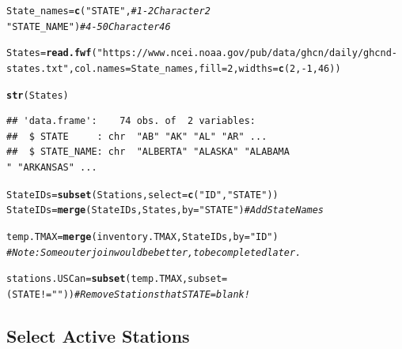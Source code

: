 \documentclass{article}\usepackage[]{graphicx}\usepackage[]{xcolor}
\makeatletter
\newcommand{\hlnum}[1]{\textcolor[rgb]{0.686,0.059,0.569}{#1}}%
\newcommand{\hlstr}[1]{\textcolor[rgb]{0.192,0.494,0.8}{#1}}%
\newcommand{\hlcom}[1]{\textcolor[rgb]{0.678,0.584,0.686}{\textit{#1}}}%
\newcommand{\hlopt}[1]{\textcolor[rgb]{0,0,0}{#1}}%
\newcommand{\hlstd}[1]{\textcolor[rgb]{0.345,0.345,0.345}{#1}}%
\newcommand{\hlkwb}[1]{\textcolor[rgb]{0.69,0.353,0.396}{#1}}%
\newcommand{\hlkwc}[1]{\textcolor[rgb]{0.333,0.667,0.333}{#1}}%
\newcommand{\hlkwd}[1]{\textcolor[rgb]{0.737,0.353,0.396}{\textbf{#1}}}%
\newenvironment{kframe}{%
 \def\at@end@of@kframe{}%
 \ifinner\ifhmode%
  \def\at@end@of@kframe{\end{minipage}}%
  \begin{minipage}{\columnwidth}%
 \fi\fi%
 \def\FrameCommand##1{\hskip\@totalleftmargin \hskip-\fboxsep
 \colorbox{shadecolor}{##1}\hskip-\fboxsep
     \hskip-\linewidth \hskip-\@totalleftmargin \hskip\columnwidth}%
 \MakeFramed {\advance\hsize-\width
   \@totalleftmargin\z@ \linewidth\hsize
   \@setminipage}}%
 {\par\unskip\endMakeFramed%
 \at@end@of@kframe}
\newenvironment{knitrout}{}{} %
\makeatother
\begin{document}
\begin{knitrout}
\begin{kframe}
\begin{alltt}
\hlstd{State_names} \hlkwb{=} \hlkwd{c}\hlstd{(}\hlstr{"STATE"}\hlstd{,} \hlcom{#         1-2    Character 2}
                \hlstr{"STATE_NAME"}\hlstd{)} \hlcom{#         4-50    Character 46}


\hlstd{States} \hlkwb{=} \hlkwd{read.fwf}\hlstd{(}\hlstr{"https://www.ncei.noaa.gov/pub/data/ghcn/daily/ghcnd-states.txt"}\hlstd{,} \hlkwc{col.names}\hlstd{=State_names,} \hlkwc{fill}\hlstd{=}\hlnum{2}\hlstd{,} \hlkwc{widths}\hlstd{=}\hlkwd{c}\hlstd{(}\hlnum{2}\hlstd{,} \hlopt{-}\hlnum{1}\hlstd{,} \hlnum{46}\hlstd{))}


\hlkwd{str}\hlstd{(States)}
\end{alltt}
\begin{verbatim}
## 'data.frame':	74 obs. of  2 variables:
##  $ STATE     : chr  "AB" "AK" "AL" "AR" ...
##  $ STATE_NAME: chr  "ALBERTA" "ALASKA" "ALABAMA                                       " "ARKANSAS" ...
\end{verbatim}
\begin{alltt}
\hlstd{StateIDs} \hlkwb{=} \hlkwd{subset}\hlstd{(Stations,} \hlkwc{select}\hlstd{=}\hlkwd{c}\hlstd{(}\hlstr{"ID"}\hlstd{,} \hlstr{"STATE"}\hlstd{))}
\hlstd{StateIDs} \hlkwb{=} \hlkwd{merge}\hlstd{(StateIDs, States,} \hlkwc{by}\hlstd{=}\hlstr{"STATE"}\hlstd{)} \hlcom{# Add State Names}

\hlstd{temp.TMAX} \hlkwb{=} \hlkwd{merge}\hlstd{(inventory.TMAX, StateIDs,} \hlkwc{by}\hlstd{=}\hlstr{"ID"}\hlstd{)}
\hlcom{# Note: Some outer join would be better, to be completed later.}

\hlstd{stations.USCan} \hlkwb{=} \hlkwd{subset}\hlstd{(temp.TMAX,} \hlkwc{subset}\hlstd{=(STATE}\hlopt{!=}\hlstr{"  "}\hlstd{))} \hlcom{# Remove Stations that STATE = blank!}
\end{alltt}
\end{kframe}
\end{knitrout}

\subsection{Select Active Stations}
\end{document}

